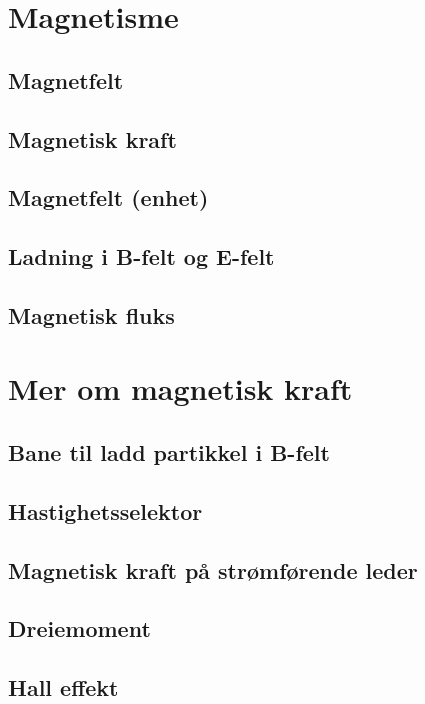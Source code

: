 \documentclass{article}
\begin{document}
  \section{Magnetisme}
    \subsection{Magnetfelt}
      
    \subsection{Magnetisk kraft}
      
    \subsection{Magnetfelt (enhet)}
      
    \subsection{Ladning i B-felt og E-felt}
      
    \subsection{Magnetisk fluks}
      
  \section{Mer om magnetisk kraft}
    \subsection{Bane til ladd partikkel i B-felt}
      
    \subsection{Hastighetsselektor}
      
    \subsection{Magnetisk kraft på strømførende leder}
      
    \subsection{Dreiemoment}
      
    \subsection{Hall effekt}
      
\end{document}
